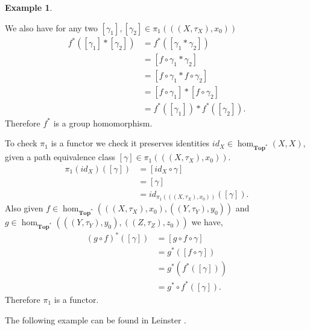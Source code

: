 \documentclass[11pt,a4paper]{article}
\theoremstyle{definition}
\newtheorem{example}[thm]{Example}
\newcommand\ho[3][]{\hom_{#1}(#2,#3)}
\numberwithin{equation}{section}
\begin{document}
\begin{example}
\begin{enumerate}
        We also have for any two $[\gamma_1],[\gamma_2]\in\pi_1(((X,\tau_X),x_{0}))$ 
        \begin{align*}
        f^*([\gamma_1]*[\gamma_2])&=f^*([\gamma_1*\gamma_2])\\
        &=[f\circ\gamma_1*\gamma_2] \\
        &= [f\circ\gamma_1*f\circ\gamma_2] \\
        &= [f\circ\gamma_1]*[f\circ\gamma_2]\\
        &= f^*([\gamma_1])*f^*([\gamma_2]).
        \end{align*}
        Therefore $f^*$ is a group homomorphism.
    \end{enumerate}
    To check $\pi_1$ is a functor we check it preserves identities $id_{X}\in\ho[\mathbf{Top}^*]{X}{X}$, given a path equivalence class $[\gamma]\in\pi_1(((X,\tau_X),x_{0}))$.
    \begin{align*} 
    \pi_{1}(id_{X})([\gamma]) &= [id_{X}\circ\gamma] \\
    &= [\gamma] \\
    &= id_{\pi_1(((X,\tau_X),x_{0}))}([\gamma]).
    \end{align*}
    Also given $f\in\ho[\mathbf{Top}^*]{((X,\tau_X),x_{0})}{((Y,\tau_Y),y_{0})}$ and $g\in\ho[\mathbf{Top}^*]{((Y,\tau_Y),y_{0})}{((Z,\tau_Z),z_{0})}$ we have,
    \begin{align*}
        (g\circ f)^*([\gamma]) &= [g\circ f\circ\gamma]\\
        &= g^*([f\circ\gamma])\\
        &= g^*(f^*([\gamma]))\\
        &= g^*\circ f^*([\gamma]).
    \end{align*}
    Therefore $\pi_{1}$ is a functor.
\end{example}
The following example can be found in Leinster \cite{Leinster}.
\end{document}
